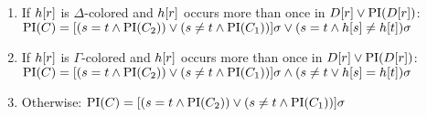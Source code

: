 \begin{defi}
\begin{itemize}
\begin{enumerate}
				\item If $h[r]$ is $\Delta$-colored and 
					$h[r]$ occurs more than once in $D[r] \lor \operatorname{PI}(D[r])$:
					\label{def:PI_paramod_1}
					\newline
					$\operatorname{PI}(C) = [ ( s=t \land \operatorname{PI}(C_2) ) \lor (s\neq t \land \operatorname{PI}(C_1)) ]\sigma \lor (s=t \land h[s] \neq h[t])\sigma$ 
				\item If $h[r]$ is $\Gamma$-colored and 
					$h[r]$ occurs more than once in $D[r] \lor \operatorname{PI}(D[r])$:
					\label{def:PI_paramod_2}
					\newline
					$\operatorname{PI}(C) = [ ( s=t \land \operatorname{PI}(C_2) ) \lor (s\neq t \land \operatorname{PI}(C_1)) ]\sigma \land (s\neq t \lor h[s] = h[t])\sigma$ 
				\item Otherwise:
					\label{def:PI_paramod_3}
					\newline
					$\operatorname{PI}(C) = [ ( s=t \land \operatorname{PI}(C_2) ) \lor (s\neq t \land \operatorname{PI}(C_1)) ]\sigma$ \qedhere

			\end{enumerate}
	\end{itemize}
\end{defi}


